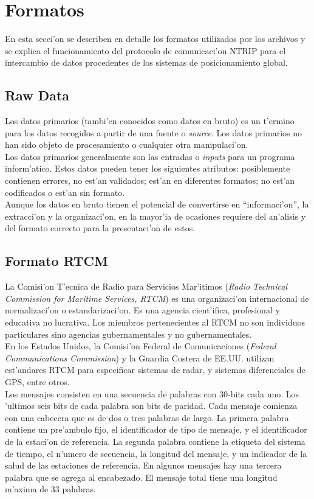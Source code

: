\section{Formatos}
\noindent
En esta secci'on se describen en detalle los formatos utilizados por los archivos y se explica el funcionamiento del protocolo de comunicaci'on NTRIP para el intercambio de datos procedentes de los sistemas de posicionamiento global.

\subsection{Raw Data}
\noindent
Los datos primarios (tambi'en conocidos como datos en bruto) es un t'ermino para los datos recogidos a partir de una fuente o \emph{source}. Los datos primarios no han sido objeto de procesamiento o cualquier otra manipulaci'on. \\

Los datos primarios generalmente son las entradas o \emph{inputs} para un programa inform'atico. Estos datos pueden tener los siguientes atributos: posiblemente contienen errores, no est'an validados; est'an en diferentes formatos; no est'an codificados o est'an sin formato.\\

Aunque los datos en bruto tienen el potencial de convertirse en ``informaci'on'', la extracci'on y la organizaci'on, en la mayor'ia de ocasiones requiere del an'alisis y del formato correcto para la presentaci'on de estos.

\subsection{Formato RTCM}
\noindent
La Comisi'on T'ecnica de Radio para Servicios Mar'itimos (\emph{Radio Technical Commission for Maritime Services, RTCM}) es una organizaci'on internacional de normalizaci'on o estandarizaci'on. Es una agencia cient'ifica, profesional y educativa no lucrativa.
Los miembros pertenecientes al RTCM no son individuos particulares sino agencias gubernamentales y no gubernamentales.\\

En los Estados Unidos, la Comisi'on Federal de Comunicaciones (\emph{Federal Communications Commission}) y la Guardia Costera de EE.UU. utilizan est'andares RTCM para especificar sistemas de radar, y sistemas diferenciales de GPS, entre otros.\\

Los mensajes consisten en una secuencia de palabras con 30-bits cada uno. Los 'ultimos seis bits de cada palabra son bits de paridad. Cada mensaje comienza con una cabecera que es de dos o tres palabras de largo. La primera palabra contiene un pre'ambulo fijo, el identificador de tipo de mensaje, y el identificador de la estaci'on de referencia. La segunda palabra contiene la etiqueta del sistema de tiempo, el n'umero de secuencia, la longitud del mensaje, y un indicador de la salud de las estaciones de referencia. En algunos mensajes hay una tercera palabra que se agrega al encabezado. El mensaje total tiene una longitud m'axima de 33 palabras.\\

